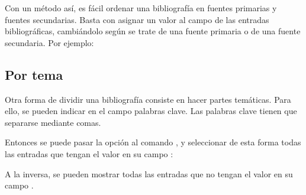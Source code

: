 Con un método así, es fácil ordenar una bibliografía en fuentes
primarias  y fuentes secundarias. Basta con asignar un valor al campo
 de las entradas bibliográficas, cambiándolo según
se trate de una fuente primaria o de una fuente secundaria. Por ejemplo:



\subsection{Por tema}

Otra forma de dividir una bibliografía consiste en hacer partes temáticas. Para ello, se pueden indicar en el campo   palabras clave. Las palabras clave tienen que separarse mediante comas.

Entonces se puede pasar la opción  al comando , y seleccionar de esta forma todas las entradas que tengan el valor   en su campo :

\begin{latexcode}
\printbibliography[keyword=xxx]
\end{latexcode}

A la inversa, se pueden mostrar todas las entradas que no tengan el valor  en su campo .

\begin{latexcode}
\printbibliography[notkeyword=xxx]
\end{latexcode}

